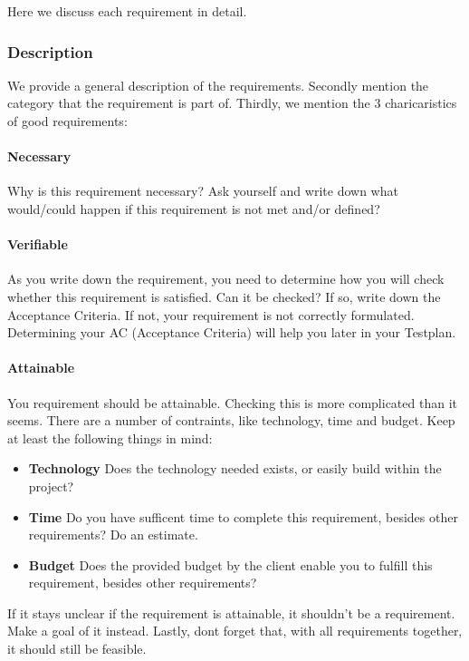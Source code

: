 \documentclass[10pt]{report}
\begin{document}
Here we discuss each requirement in detail. 

\subsubsection{Description}

We provide a general description of the requirements. Secondly mention the category that the requirement is part of. Thirdly, we mention the 3 charicaristics of good requirements:

\paragraph{Necessary}

Why is this requirement necessary? Ask yourself and write down what would/could happen if this requirement is not met and/or defined?

\paragraph{Verifiable}

As you write down the requirement, you need to determine how you will check whether this requirement is satisfied. Can it be checked? If so, write down the Acceptance Criteria. If not, your requirement is not correctly formulated. Determining your AC (Acceptance Criteria) will help you later in your Testplan.

\paragraph{Attainable}

You requirement should be attainable. Checking this is more complicated than it seems. There are a number of contraints, like technology, time and budget. Keep at least the following things in mind:

\begin{itemize}
	\item \textbf{Technology} Does the technology needed exists, or easily build within the project?
	\item \textbf{Time} Do you have sufficent time to complete this requirement, besides other requirements? Do an estimate.
	\item \textbf{Budget} Does the provided budget by the client enable you to fulfill this requirement, besides other requirements?
\end{itemize}

\noindent If it stays unclear if the requirement is attainable, it shouldn't be a requirement. Make a goal of it instead. Lastly, dont forget that, with all requirements together, it should still be feasible.
\end{document}
